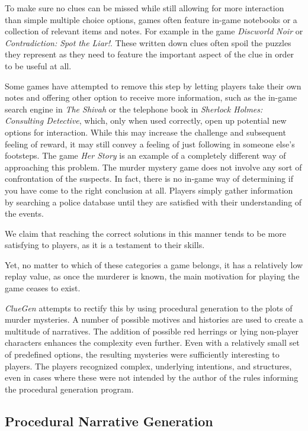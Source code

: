 To make sure no clues can be missed while still allowing for more interaction than simple multiple choice options, games often feature in-game notebooks or a collection of relevant items and notes.
For example in the game \emph{Discworld Noir} or \emph{Contradiction: Spot the Liar!}.
These written down clues often spoil the puzzles they represent as they need to feature the important aspect of the clue in order to be useful at all.

Some games have attempted to remove this step by letting players take their own notes and offering other option to receive more information, such as the in-game search engine in \emph{The Shivah} or the telephone book in \emph{Sherlock Holmes: Consulting Detective}, which, only when used correctly, open up potential new options for interaction.
While this may increase the challenge and subsequent feeling of reward, it may still convey a feeling of just following in someone else's footsteps.
The game \emph{Her Story} is an example of a completely different way of approaching this problem.
The murder mystery game does not involve any sort of confrontation of the suspects.
In fact, there is no in-game way of determining if you have come to the right conclusion at all.
Players simply gather information by searching a police database until they are satisfied with their understanding of the events.

We claim that reaching the correct solutions in this manner tends to be more satisfying to players, as it is a testament to their skills.

Yet, no matter to which of these categories a game belongs, it has a relatively low replay value, as once the murderer is known, the main motivation for playing the game ceases to exist.

\emph{ClueGen} \cite{stockdale_2016} attempts to rectify this by using procedural generation to the plots of murder mysteries.
A number of possible motives and histories are used to create a multitude of narratives.
The addition of possible red herrings or lying non-player characters enhances the complexity even further.
Even with a relatively small set of predefined options, the resulting mysteries were sufficiently interesting to players.
The players recognized complex, underlying intentions, and structures, even in cases where these were not intended by the author of the rules informing the procedural generation program.

\subsection{Procedural Narrative Generation}

